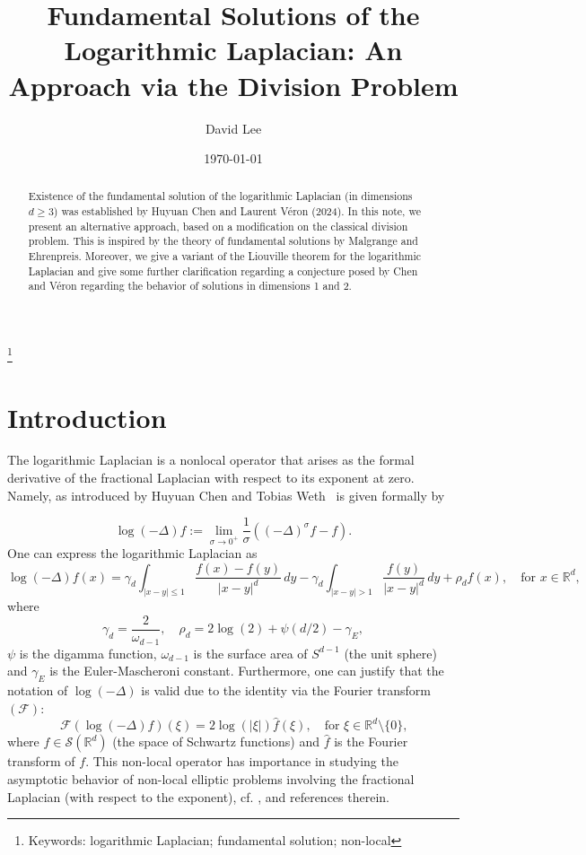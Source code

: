 \documentclass[11pt]{amsart}
\title[Fundamental solutions of the Logarithmic Laplacian]{Fundamental Solutions of the Logarithmic Laplacian: An Approach via the Division Problem}
\author{
  David Lee
}
\date{\today}
\begin{document}
\begin{abstract}
Existence of the fundamental solution of the logarithmic Laplacian (in dimensions $d \geq 3$) was established by Huyuan Chen and Laurent V\'eron (2024). In this note, we present an alternative approach, based on a modification on the classical division problem. This is inspired by the theory of fundamental solutions by Malgrange and Ehrenpreis. Moreover, we give a variant of the Liouville theorem for the logarithmic Laplacian and give some further clarification 
regarding a conjecture posed by Chen and V\'eron regarding the behavior of solutions in dimensions 1 and 2.
\end{abstract}

\thanks{Keywords: logarithmic Laplacian; fundamental solution; non-local}
\maketitle



\section{Introduction}

The logarithmic Laplacian is a nonlocal operator that arises as the formal derivative of the fractional Laplacian with respect to its exponent at zero. Namely, as introduced by Huyuan Chen and Tobias Weth~\cite{MR3995092} is given formally by

\begin{equation*}
\log(-\Delta)f:=\lim_{\sigma \rightarrow 0^{+}}\frac{1}{\sigma}\left ((-\Delta)^\sigma f-f \right ).
\end{equation*}
One can express the logarithmic Laplacian as
\begin{equation}\label{eqn:logarithmic_laplacian}
\log(-\Delta)f(x)=\gamma_{d}\int_{|x-y|\leq 1}\frac{f(x)-f(y)}{|x-y|^d}\,dy-\gamma_{d}\int_{|x-y|>1}\frac{f(y)}{|x-y|^d}\,dy+\rho_{d} f(x), \quad \text{for $x\in \mathbb{R}^d$, }
\end{equation}
where 
\begin{equation*}
\gamma_{d}=\frac{2}{\omega_{d-1}}, \quad \rho_{d}=2\log(2)+\psi(d/2)-\gamma_{E},
\end{equation*}
$\psi$ is the digamma function, $\omega_{d-1}$ is the surface area of $S^{d-1}$ (the unit sphere) and $\gamma_{E}$ is the Euler-Mascheroni constant. Furthermore, one can justify that the notation of $\log(-\Delta)$ is valid due to the identity via the Fourier transform $(\mathcal{F})$:
\begin{equation*}
	\mathcal{F}\left ( \log(-\Delta)f\right )(\xi)=2\log(|\xi|)\hat{f}(\xi), \quad \text{for $\xi \in \mathbb{R}^d\setminus \{0\}$,}
\end{equation*}
where $f\in \mathcal{S}(\mathbb{R}^d)$ (the space of Schwartz functions) and $\hat{f}$ is the Fourier transform of $f$. This non-local operator has importance in studying the asymptotic behavior of non-local elliptic problems involving the fractional Laplacian (with respect to the exponent), cf. \cite{MR3995092}, \cite{bungert2024convergenceratesfractionallocal} and references therein.
\end{document}
